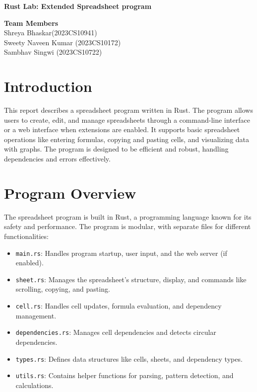 \documentclass[12pt]{article}
\begin{document}
\begin{center}
\vspace*{0.5cm}
\Large
\textbf{Rust Lab: Extended Spreadsheet program}

\vspace{0.5cm}
\small
\textbf{Team Members}
\vspace{0.5cm}
\\Shreya Bhaskar(2023CS10941)
\\Sweety Naveen Kumar (2023CS10172)
\\Sambhav Singwi (2023CS10722)
\vspace{0.5cm}
\end{center}

\tableofcontents
\newpage






\section{Introduction}
This report describes a spreadsheet program written in Rust. The program allows users to create, edit, and manage spreadsheets through a command-line interface or a web interface when extensions are enabled. It supports basic spreadsheet operations like entering formulas, copying and pasting cells, and visualizing data with graphs. The program is designed to be efficient and robust, handling dependencies and errors effectively.

\section{Program Overview}
The spreadsheet program is built in Rust, a programming language known for its safety and performance. The program is modular, with separate files for different functionalities:
\begin{itemize}
    \item \texttt{main.rs}: Handles program startup, user input, and the web server (if enabled).
    \item \texttt{sheet.rs}: Manages the spreadsheet’s structure, display, and commands like scrolling, copying, and pasting.
    \item \texttt{cell.rs}: Handles cell updates, formula evaluation, and dependency management.
    \item \texttt{dependencies.rs}: Manages cell dependencies and detects circular dependencies.
    \item \texttt{types.rs}: Defines data structures like cells, sheets, and dependency types.
    \item \texttt{utils.rs}: Contains helper functions for parsing, pattern detection, and calculations.
\end{itemize}
\end{document}
